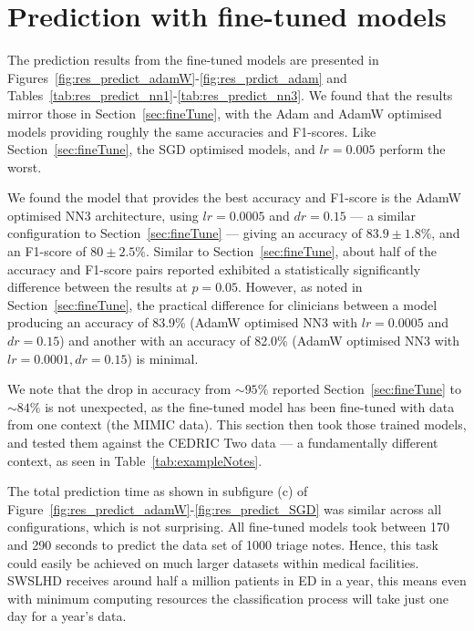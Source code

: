 \documentclass[a4paper,12pt]{article}
\newcommand{\mimicData}{MIMIC data\xspace}   %
\newcommand{\inghamTwo}{CEDRIC Two\xspace}  %
\begin{document}
\section{Prediction with fine-tuned models}
\label{sec:pred1}

The prediction results from the fine-tuned models are presented in Figures~\ref{fig:res_predict_adamW}-\ref{fig:res_prdict_adam} and Tables~\ref{tab:res_predict_nn1}-\ref{tab:res_predict_nn3}. We found that the results mirror those in Section~\ref{sec:fineTune}, with the Adam and AdamW optimised models providing roughly the same accuracies and F1-scores. Like Section~\ref{sec:fineTune}, the SGD optimised models, and $lr = 0.005$ perform the worst. 

We found the model that provides the best accuracy and F1-score is the AdamW optimised \ac{NN3} architecture, using $lr = 0.0005$ and $dr = 0.15$ --- a similar configuration to Section~\ref{sec:fineTune} --- giving an accuracy of $83.9 \pm 1.8\%$, and an F1-score of $80 \pm 2.5\%$. Similar to Section~\ref{sec:fineTune}, about half of the accuracy and F1-score pairs reported exhibited a statistically significantly difference between the results at $p = 0.05$. However, as noted in Section~\ref{sec:fineTune}, the practical difference for clinicians between a model producing an accuracy of 83.9\% (AdamW optimised \ac{NN3} with $lr = 0.0005$ and $dr = 0.15$) and another with an accuracy of 82.0\% (AdamW optimised \ac{NN3} with $lr = 0.0001, dr = 0.15$) is minimal. 


We note that the drop in accuracy from $\sim95\%$ reported Section~\ref{sec:fineTune} to $\sim84\%$ is not unexpected, as the fine-tuned model has been fine-tuned with data from one context (the \mimicData). This section then took those trained models, and tested them against the \inghamTwo data --- a fundamentally different context, as seen in Table~\ref{tab:exampleNotes}. 

The total prediction time as shown in subfigure (c) of Figure~\ref{fig:res_predict_adamW}-\ref{fig:res_predict_SGD} was similar across all configurations, which is not surprising. All fine-tuned models took between 170 and 290 seconds to predict the data set of 1000 triage notes. Hence, this task could easily be achieved on much larger datasets within medical facilities. \ac{SWSLHD} receives around half a million patients in \ac{ED} in a year, this means even with minimum computing resources the classification process will take just one day for a year's data. 
\end{document}
